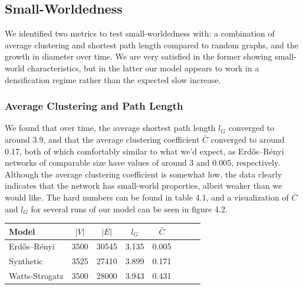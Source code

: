 \documentclass[12pt,twoside]{report}
\begin{document}
\subsection{Small-Worldedness}

We identified two metrics to test small-worldedness with: a combination of average clustering and shortest path length compared to random graphs, and the growth in diameter over time. We are very satisfied in the former showing small-world characteristics, but in the latter our model appears to work in a densification regime rather than the expected slow increase. \\

\subsubsection{Average Clustering and Path Length}

We found that over time, the average shortest path length $l_G$ converged to around 3.9, and that the average clustering coefficient $\bar{C}$ converged to around 0.17, both of which comfortably similar to what we'd expect, as Erdős–Rényi networks of comparable size have values of around 3 and 0.005, respectively. Although the average clustering coefficient is somewhat low, the data clearly indicates that the network has small-world properties, albeit weaker than we would like. The hard numbers can be found in table 4.1, and a visualization of $\bar{C}$ and $l_G$ for several runs of our model can be seen in figure 4.2. \\

\begin{center}
\begin{tabular}{l*{6}{c}r}
Model              & $|V|$ & $|E|$ & $l_G$ & $\bar{C}$ \\
\hline
Erdős–Rényi    & 3500 & 30545 & 3.135 & 0.005  \\
Synthetic      & 3525 & 27410 & 3.899 & 0.171  \\
Watts-Strogatz & 3500 & 28000 & 3.943 & 0.431  \\
\end{tabular}
\end{center}
\end{document}
